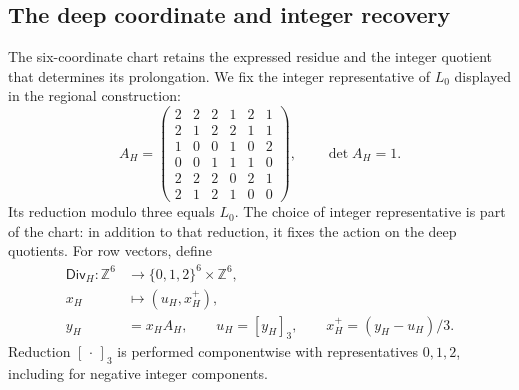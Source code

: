 \subsection{The deep coordinate and integer recovery}
\label{corpus9:xii:memoria-profunda}

The six-coordinate chart retains the expressed residue and the integer
quotient that determines its prolongation. We fix the integer
representative of \(L_0\) displayed in the regional construction:
\begin{equation}
 A_H=\begin{pmatrix}
 2&2&2&1&2&1\\
 2&1&2&2&1&1\\
 1&0&0&1&0&2\\
 0&0&1&1&1&0\\
 2&2&2&0&2&1\\
 2&1&2&1&0&0
 \end{pmatrix},\qquad \det A_H=1.
 \label{corpus9:xii:matriz-profunda}
\end{equation}
Its reduction modulo three equals \(L_0\). The choice of integer
representative is part of the chart: in addition to that reduction, it
fixes the action on the deep quotients. For row vectors, define
\begin{equation}
 \begin{aligned}
 \mathsf{Div}_H:\mathbb Z^6&\longrightarrow
       \{0,1,2\}^6\times\mathbb Z^6,\\
 x_H&\longmapsto(u_H,x_H^+),\\
 y_H&=x_HA_H,\qquad u_H=[y_H]_3,\qquad
 x_H^+=(y_H-u_H)/3.
 \end{aligned}
 \label{corpus9:xii:division-profunda}
\end{equation}
Reduction \([\,\cdot\,]_3\) is performed componentwise with
representatives \(0,1,2\), including for negative integer components.

